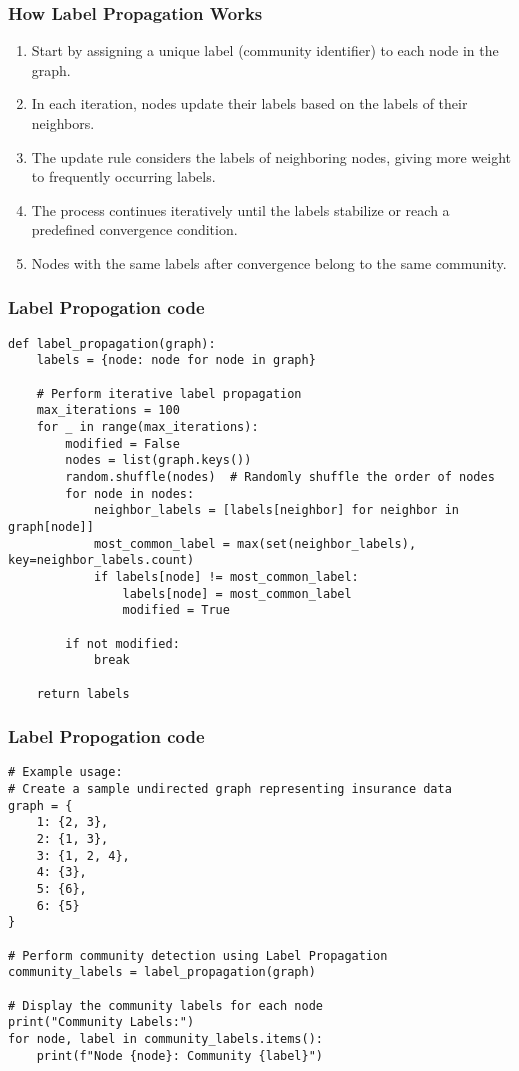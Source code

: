 \begin{frame}[fragile]\frametitle{How Label Propagation Works}
\begin{enumerate}
\item Start by assigning a unique label (community identifier) to each node in the graph.
\item In each iteration, nodes update their labels based on the labels of their neighbors.
\item The update rule considers the labels of neighboring nodes, giving more weight to frequently occurring labels.
\item The process continues iteratively until the labels stabilize or reach a predefined convergence condition.
\item Nodes with the same labels after convergence belong to the same community.
\end{enumerate}
\end{frame}

\begin{frame}[fragile]\frametitle{Label Propogation code}
{\tiny
\begin{lstlisting}
def label_propagation(graph):
    labels = {node: node for node in graph}

    # Perform iterative label propagation
    max_iterations = 100
    for _ in range(max_iterations):
        modified = False
        nodes = list(graph.keys())
        random.shuffle(nodes)  # Randomly shuffle the order of nodes
        for node in nodes:
            neighbor_labels = [labels[neighbor] for neighbor in graph[node]]
            most_common_label = max(set(neighbor_labels), key=neighbor_labels.count)
            if labels[node] != most_common_label:
                labels[node] = most_common_label
                modified = True

        if not modified:
            break

    return labels
\end{lstlisting}
}
\end{frame}



\begin{frame}[fragile]\frametitle{Label Propogation code}
{\tiny
\begin{lstlisting}
# Example usage:
# Create a sample undirected graph representing insurance data
graph = {
    1: {2, 3},
    2: {1, 3},
    3: {1, 2, 4},
    4: {3},
    5: {6},
    6: {5}
}

# Perform community detection using Label Propagation
community_labels = label_propagation(graph)

# Display the community labels for each node
print("Community Labels:")
for node, label in community_labels.items():
    print(f"Node {node}: Community {label}")

\end{lstlisting}
}
\end{frame}

